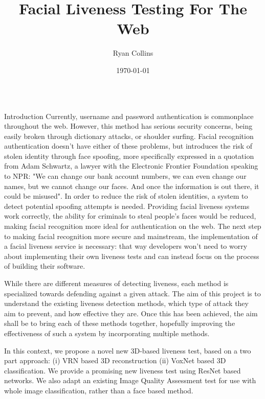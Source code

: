 \documentclass[final]{beamer}
\title[Final Year Project Poster]{Facial Liveness Testing For The Web}
\author[R Collins]{Ryan Collins}
\institute[Durham]{Department of Computer Science, Durham University}
\date{\today}
\begin{document}
  \begin{frame}{} 

  \vfill
    \begin{columns}[t]
      \begin{column}{.48\linewidth}
        \begin{block}{Introduction}
            Currently, username and password authentication is commonplace throughout the web. However, this method has serious security concerns, being easily broken through dictionary attacks,
            or shoulder surfing. Facial recognition authentication doesn't have either of these problems, but introduces the risk of stolen identity through face spoofing, more specifically expressed
            in a quotation from Adam Schwartz, a lawyer with the Electronic Frontier Foundation speaking to NPR: "We can change our bank account numbers, we can even change our names, but we cannot change our faces.
            And once the information is out there, it could be misused". In order to reduce the risk of stolen identities, a system to detect potential spoofing attempts is needed.
            Providing facial liveness systems work correctly, the ability for criminals to steal people's faces would be reduced, making facial recognition more ideal for authentication on the web. The next step
            to making facial recognition more secure and mainstream, the implementation of a facial liveness service is necessary: that way developers won't need to worry about implementing their own liveness tests
            and can instead focus on the process of building their software.
        
            While there are different measures of detecting liveness, each method is specialized towards defending against a given attack. The aim of this project is to understand
            the existing liveness detection methods, which type of attack they aim to prevent, and how effective they are. Once this has been achieved, the aim shall be to bring
            each of these methods together, hopefully improving the effectiveness of such a system by incorporating multiple methods.
            
        
            In this context, we propose a novel new 3D-based liveness test, based on a two part approach: (i) VRN based 3D reconstruction (ii) VoxNet based 3D classification.
            We provide a promising new liveness test using ResNet based networks. We also adapt an existing Image Quality Assessment test for use with whole image classification, rather
            than a face based method.


\end{block}
\end{column}
\end{columns}
\end{frame}
\end{document}
